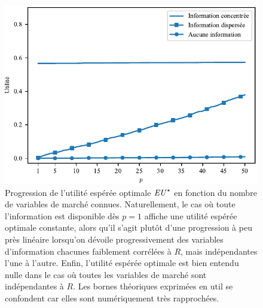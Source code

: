 \begin{figure}[h!]
  \centering
  \includegraphics[width=\textwidth]{../experiments/fig/pconst_euinforelative.pdf}
  \caption{Progression de l'utilité espérée optimale $\operatorname{\mbox{\textit{EU}}}^\star$ en fonction du nombre de
    variables de marché connues. Naturellement, le cas où toute l'information est
    disponible dès $p=1$ affiche une utilité espérée optimale constante, alors qu'il
    s'agit plutôt d'une progression à peu près linéaire lorsqu'on dévoile progressivement
    des variables d'information chacunes faiblement corrélées à $R$, mais indépendantes
    l'une à l'autre. Enfin, l'utilité espérée optimale est bien entendu nulle dans le cas
    où toutes les variables de marché sont indépendantes à $R$. Les bornes théoriques
    exprimées en util se confondent car elles sont numériquement très rapprochées.}
  \label{fig_pconst_euinforelative}
\end{figure}

